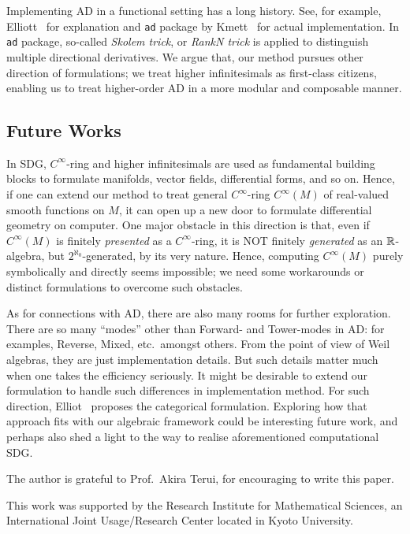 \documentclass[%
  sigconf,authorversion,screen]{acmart}
\begin{document}
Implementing AD in a functional setting has a long history.
See, for example, Elliott~\cite{Elliott2009-beautiful-differentiation} for explanation and \texttt{ad} package by Kmett~\cite{Kmett:2010aa} for actual implementation.
In \texttt{ad} package, so-called \emph{Skolem trick}, or \emph{RankN trick} is applied to distinguish multiple directional derivatives.
We argue that, our method pursues other direction of formulations; we treat higher infinitesimals as first-class citizens, enabling us to treat higher-order AD in a more modular and composable manner.

\subsection{Future Works}
In SDG, $C^\infty$-ring and higher infinitesimals are used as fundamental building blocks to formulate manifolds, vector fields, differential forms, and so on.
Hence, if one can extend our method to treat general $C^\infty$-ring $C^\infty(M)$ of real-valued smooth functions on $M$, it can open up a new door to formulate differential geometry on computer.
One major obstacle in this direction is that, even if $C^\infty(M)$ is finitely \emph{presented} as a $C^\infty$-ring, it is NOT finitely \emph{generated} as an $\mathbb{R}$-algebra, but $2^{\aleph_0}$-generated, by its very nature.
Hence, computing $C^\infty(M)$ purely symbolically and directly seems impossible; we need some workarounds or distinct formulations to overcome such obstacles.

As for connections with AD, there are also many rooms for further exploration.
There are so many ``modes'' other than Forward- and Tower-modes in AD: for examples, Reverse, Mixed, etc.\ amongst others.
From the point of view of Weil algebras, they are just implementation details.
But such details matter much when one takes the efficiency seriously.
It might be desirable to extend our formulation to handle such differences in implementation method.
For such direction, Elliot~\cite{Elliott:2018aa} proposes the categorical formulation.
Exploring how that approach fits with our algebraic framework could be interesting future work, and perhaps also shed a light to the way to realise aforementioned computational SDG.

\begin{acks}
The author is grateful to Prof.\ Akira Terui, for encouraging  to write this paper.

This work was supported by the Research Institute for Mathematical Sciences,
an International Joint Usage/Research Center located in Kyoto University.
\end{acks}
\end{document}
